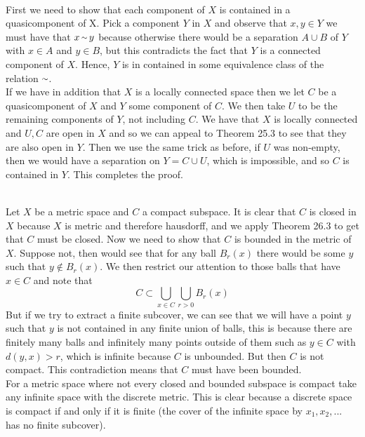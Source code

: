 \documentclass{article}
\DeclareMathOperator{\mtilde}{{\raise.17ex\hbox{$\scriptstyle\sim$}}}
\newcommand{\problem}[1]{\noindent{\textbf{Problem #1}}\\}
\newcommand{\problempart}[1]{\noindent{\textbf{(#1)}}}
\begin{document}
\problem{3.25.10}
\problempart{b} First we need to show that each component of $X$ is contained in a quasicomponent of X. Pick a component $Y$ in $X$ and observe that $x,y \in Y$ we must have that $x \mtilde y$ because otherwise there would be a separation $A \cup B$ of $Y$ with $x\in A$ and $y\in B$, but this contradicts the fact that $Y$ is a connected component of $X$. Hence, $Y$ is in contained in some equivalence class of the relation $\mtilde$. \\
If we have in addition that $X$ is a locally connected space then we let $C$ be a quasicomponent of $X$ and $Y$ some component of $C$. We then take $U$ to be the remaining components of $Y$, not including $C$. We have that $X$ is locally connected and $U,C$ are open in $X$ and so we can appeal to Theorem 25.3 to see that they are also open in $Y$. Then we use the same trick as before, if $U$ was non-empty, then we would have a separation on $Y = C \cup U$, which is impossible, and so $C$ is contained in $Y$. This completes the proof. 

\problem{3.26.4} Let $X$ be a metric space and $C$ a compact subspace. It is clear that $C$ is closed in $X$ because $X$ is metric and therefore hausdorff, and we apply Theorem 26.3 to get that $C$ must be closed. Now we need to show that $C$ is bounded in the metric of $X$. Suppose not, then would see that for any ball $B_r(x)$ there would be some $y$ such that $y\not\in B_r(x)$. We then restrict our attention to those balls that have $x \in C$ and note that 
\[
C \subset \bigcup_{x\in C}\bigcup_{r > 0} B_r(x)
\]
But if we try to extract a finite subcover, we can see that we will have a point $y$ such that $y$ is not contained in any finite union of balls, this is because there are finitely many balls and infinitely many points outside of them such as $y \in C$ with $d(y,x) > r$, which is infinite because $C$ is unbounded. But then $C$ is not compact. This contradiction means that $C$ must have been bounded. \\
For a metric space where not every closed and bounded subspace is compact take any infinite space with the discrete metric. This is clear because a discrete space is compact if and only if it is finite (the cover of the infinite space by $x_1,x_2,...$ has no finite subcover). 
\end{document}
